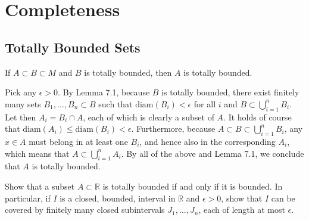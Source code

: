 \chapter{Completeness}

\section{Totally Bounded Sets}

\begin{exercise}{1}
    If $A \subset B \subset M$ and \(B\) is totally bounded, then \(A\) is totally bounded.
\end{exercise}

\begin{solution}
    
    Pick any $\epsilon > 0$.
    By Lemma 7.1, because $B$ is totally bounded, there exist finitely many sets $B_1, \ldots, B_n \subset B$ such that $\text{diam}(B_i) < \epsilon$ for all $i$ and $B \subset \bigcup_{i=1}^{n} B_i$.
    Let then $A_i = B_i \cap A$, each of which is clearly a subset of $A$.
    It holds of course that $\text{diam}(A_i) \leq \text{diam}(B_i) < \epsilon$.
    Furthermore, because $A \subset B \subset \bigcup_{i=1}^{n} B_i$, any $x \in A$ must belong in at least one $B_i$, and hence also in the corresponding $A_i$, which means that $A \subset \bigcup_{i=1}^{n} A_i$.
    By all of the above and Lemma 7.1, we conclude that $A$ is totally bounded.
\end{solution}

\begin{exercise}{2}
    Show that a subset $A \subset \mathbb{R}$ is totally bounded if and only if it is bounded.
    In particular, if $I$ is a closed, bounded, interval in $\mathbb{R}$ and $\epsilon > 0$, show that $I$ can be covered by finitely many closed subintervals $J_1, \ldots, J_n$, each of length at most $\epsilon$.
\end{exercise}

